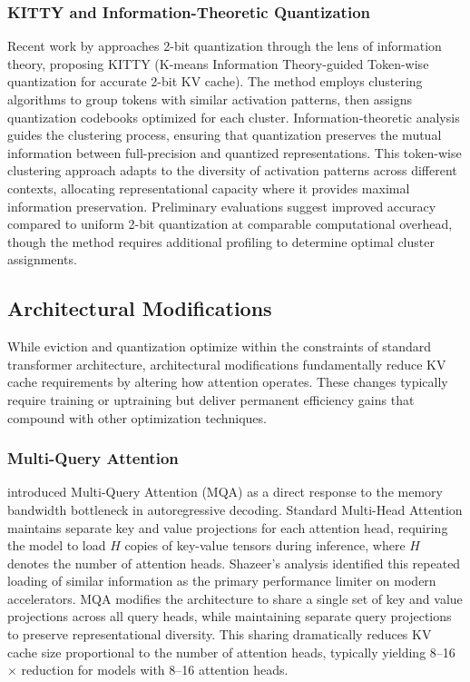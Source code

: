 \subsubsection{KITTY and Information-Theoretic Quantization}

Recent work by \citet{yuan2024kitty} approaches 2-bit quantization through the lens of information theory, proposing KITTY (K-means Information Theory-guided Token-wise quantization for accurate 2-bit KV cache). The method employs clustering algorithms to group tokens with similar activation patterns, then assigns quantization codebooks optimized for each cluster. Information-theoretic analysis guides the clustering process, ensuring that quantization preserves the mutual information between full-precision and quantized representations. This token-wise clustering approach adapts to the diversity of activation patterns across different contexts, allocating representational capacity where it provides maximal information preservation. Preliminary evaluations suggest improved accuracy compared to uniform 2-bit quantization at comparable computational overhead, though the method requires additional profiling to determine optimal cluster assignments.

\subsection{Architectural Modifications}

While eviction and quantization optimize within the constraints of standard transformer architecture, architectural modifications fundamentally reduce KV cache requirements by altering how attention operates. These changes typically require training or uptraining but deliver permanent efficiency gains that compound with other optimization techniques.

\subsubsection{Multi-Query Attention}

\citet{shazeer2019fast} introduced Multi-Query Attention (MQA) as a direct response to the memory bandwidth bottleneck in autoregressive decoding. Standard Multi-Head Attention maintains separate key and value projections for each attention head, requiring the model to load $H$ copies of key-value tensors during inference, where $H$ denotes the number of attention heads. Shazeer's analysis identified this repeated loading of similar information as the primary performance limiter on modern accelerators. MQA modifies the architecture to share a single set of key and value projections across all query heads, while maintaining separate query projections to preserve representational diversity. This sharing dramatically reduces KV cache size proportional to the number of attention heads, typically yielding 8--16$\times$ reduction for models with 8--16 attention heads.

